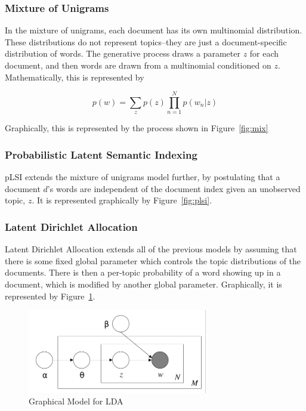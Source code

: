 \documentclass{article}
\begin{document}
\subsubsection{Mixture of Unigrams}

In the mixture of unigrams, each document has its own multinomial distribution.
These distributions do not represent topics--they are just a document-specific distribution of
words. The generative process draws a parameter $z$ for each document, and then
words are drawn from a multinomial conditioned on $z$. Mathematically, this is
represented by

\[
  p(w) = \sum_z p(z) \prod\limits_{n=1}^N p(w_n | z)
\]

Graphically, this is represented by the process shown in Figure~\ref{fig:mix}

\subsubsection{Probabilistic Latent Semantic Indexing}

pLSI extends the mixture of unigrams model further, by postulating that a
document $d$'s words are independent of the document index given an unobserved
topic, $z$. It is represented graphically by Figure~\ref{fig:plsi}.

\subsubsection{Latent Dirichlet Allocation}
\label{sec:lda}

Latent Dirichlet Allocation extends all of the previous models by assuming that
there is some fixed global parameter which controls the topic distributions of
the documents. There is then a per-topic probability of a word showing up in a
document, which is modified by another global parameter. Graphically, it is
represented by Figure~\ref{fig:ldagraph}.

\begin{figure}
  \centering
  \includegraphics[width=0.7\textwidth]{lda}
  \caption{Graphical Model for LDA}
  \label{fig:ldagraph}
\end{figure}
\end{document}
